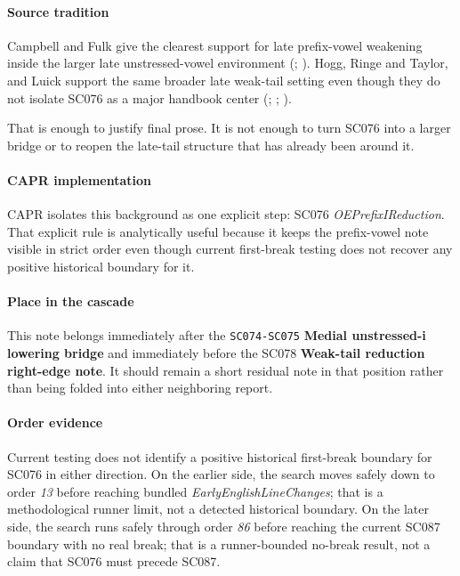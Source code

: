 \documentclass[
  british,
  a4paper,
]{article}
\begin{document}
\paragraph{Source tradition}\label{source-tradition-47}

Campbell and Fulk give the clearest support for late prefix-vowel
weakening inside the larger late unstressed-vowel environment
(;
). Hogg, Ringe and
Taylor, and Luick support the same broader late weak-tail setting even
though they do not isolate SC076 as a major handbook center
(;
; ).

That is enough to justify final prose. It is not enough to turn SC076
into a larger bridge or to reopen the late-tail structure that has
already been around it.

\paragraph{CAPR implementation}\label{capr-implementation-47}

CAPR isolates this background as one explicit step: SC076
\emph{OEPrefixIReduction}. That explicit rule is analytically useful
because it keeps the prefix-vowel note visible in strict order even
though current first-break testing does not recover any positive
historical boundary for it.

\paragraph{Place in the cascade}\label{place-in-the-cascade-47}

This note belongs immediately after the \texttt{SC074-SC075}
\textbf{Medial unstressed-i lowering bridge} and immediately before the
SC078 \textbf{Weak-tail reduction right-edge note}. It should remain a
short residual note in that position rather than being folded into
either neighboring report.

\paragraph{Order evidence}\label{order-evidence-47}

Current testing does not identify a positive historical first-break
boundary for SC076 in either direction. On the earlier side, the search
moves safely down to order \emph{13} before reaching bundled
\emph{EarlyEnglishLineChanges}; that is a methodological runner limit,
not a detected historical boundary. On the later side, the search runs
safely through order \emph{86} before reaching the current SC087
boundary with no real break; that is a runner-bounded no-break result,
not a claim that SC076 must precede SC087.
\end{document}
